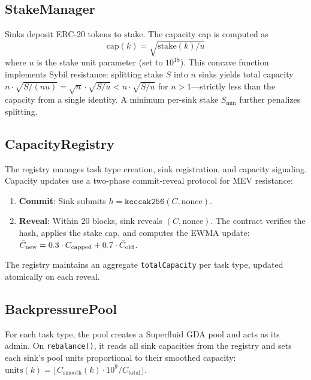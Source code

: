\subsection{StakeManager}

Sinks deposit ERC-20 tokens to stake. The capacity cap is computed as
\begin{equation}\label{eq:capacity-cap}
\text{cap}(k) = \sqrt{\text{stake}(k) / u}
\end{equation}
where $u$ is the stake unit
parameter (set to $10^{18}$). This concave function implements Sybil resistance:
splitting stake $S$ into $n$ sinks yields total capacity
$n \cdot \sqrt{S/(nu)} = \sqrt{n} \cdot \sqrt{S/u} < n \cdot \sqrt{S/u}$
for $n > 1$---strictly less than the capacity from a single identity.
A minimum per-sink stake $S_{\min}$ further penalizes splitting.

\subsection{CapacityRegistry}

The registry manages task type creation, sink registration, and capacity
signaling. Capacity updates use a two-phase commit-reveal protocol for
MEV resistance:

\begin{enumerate}
  \item \textbf{Commit}: Sink submits $h = \texttt{keccak256}(C, \text{nonce})$.
  \item \textbf{Reveal}: Within 20 blocks, sink reveals $(C, \text{nonce})$.
        The contract verifies the hash, applies the stake cap, and computes
        the EWMA update: $\bar{C}_{\text{new}} = 0.3 \cdot C_{\text{capped}}
        + 0.7 \cdot \bar{C}_{\text{old}}$.
\end{enumerate}

The registry maintains an aggregate \texttt{totalCapacity} per task type,
updated atomically on each reveal.

\subsection{BackpressurePool}

For each task type, the pool creates a Superfluid GDA pool and acts as its
admin. On \texttt{rebalance()}, it reads all sink capacities from the registry
and sets each sink's pool units proportional to their smoothed capacity:
$\text{units}(k) = \lfloor C_{\text{smooth}}(k) \cdot 10^9 / C_{\text{total}} \rfloor$.

